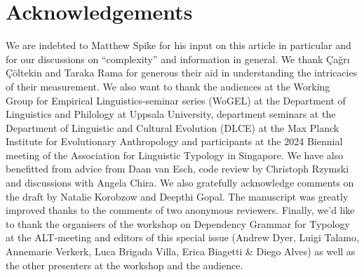 \documentclass[USenglish]{article}
\begin{document}
\section{Acknowledgements}
We are indebted to Matthew Spike for his input on this article in particular and for our discussions on ``complexity'' and information in general. We thank {\c{C}}a{\u{g}}r{\i} {\c{C}}{\"o}ltekin and Taraka Rama for generous their aid in understanding the intricacies of their measurement. We also want to thank the audiences at the Working Group for Empirical Linguistics-seminar series (WoGEL) at the Department of Linguistics and Philology at Uppsala University, department seminars at the Department of Linguistic and Cultural Evolution (DLCE) at the Max Planck Institute for Evolutionary Anthropology and participants at the 2024 Biennial meeting of the Association for Linguistic Typology in Singapore. We have also benefitted from advice from Daan van Esch, code review by Christoph Rzymski and discussions with Angela Chira. We also gratefully acknowledge comments on the draft by Natalie Korobzow and Deepthi Gopal.
The manuscript was greatly improved thanks to the comments of two anonymous reviewers.
Finally, we'd like to thank the organisers of the workshop on Dependency Grammar for Typology at the ALT-meeting and editors of this special issue (Andrew Dyer, Luigi Talamo, Annemarie Verkerk, Luca Brigada Villa, Erica Biagetti \& Diego Alves) as well as the other presenters at the workshop and the audience. 

\newpage




\end{document}
